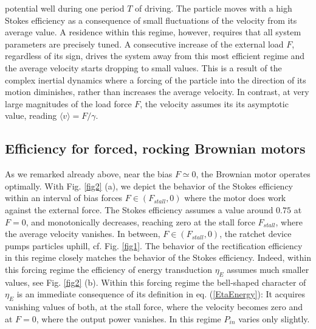 \documentclass{elsart}
\def\la{\langle}
\def\ra{\rangle}
\def\mv{\la v \ra}
\begin{document}
potential well during one period $T$ of driving.  The particle moves
with a high Stokes efficiency as a consequence of small fluctuations
of the velocity from its average value. A residence within this
regime, however, requires that all system parameters are precisely
tuned. A consecutive increase of the external load $F$, regardless of
its sign, drives the system away from this most efficient regime and
the average velocity starts dropping to small values.  This is a
result of the complex inertial dynamics where a forcing of the
particle into the direction of its motion diminishes, rather than
increases the average velocity. In contrast, at very large magnitudes
of the load force $F$, the velocity assumes its its asymptotic value,
reading $\mv=F/\gamma$.
%

\subsection{Efficiency for forced, rocking Brownian motors}
\label{num:efficiency} As we remarked already above, near the bias
$F\simeq 0$, the Brownian motor operates optimally.  With Fig.
\ref{fig2} (a), we depict the behavior of the Stokes efficiency
within an interval of bias forces $F \in (F_{stall},0)$ where the
motor does work against the external force. The Stokes efficiency
assumes a value around $0.75$ at $F=0$, and monotonically decreases,
reaching zero at the stall force $F_{stall}$, where the average
velocity vanishes. In between, $F \in (F_{stall},0)$, the ratchet
device pumps particles uphill, cf. Fig. \ref{fig1}. The behavior of
the rectification efficiency in this regime closely matches the
behavior of the Stokes efficiency. Indeed, within this forcing
regime the efficiency of energy transduction $\eta_{E}$ assumes much
smaller values, see Fig. \ref{fig2} (b). Within this forcing regime
the bell-shaped character of $\eta_E$ is an immediate consequence of
its definition in eq. (\ref{EtaEnergy}): It acquires vanishing
values of both, at the stall force, where the velocity becomes zero
and at $F=0$, where the output power vanishes. In this regime
$P_{in}$ varies only slightly.
\end{document}
